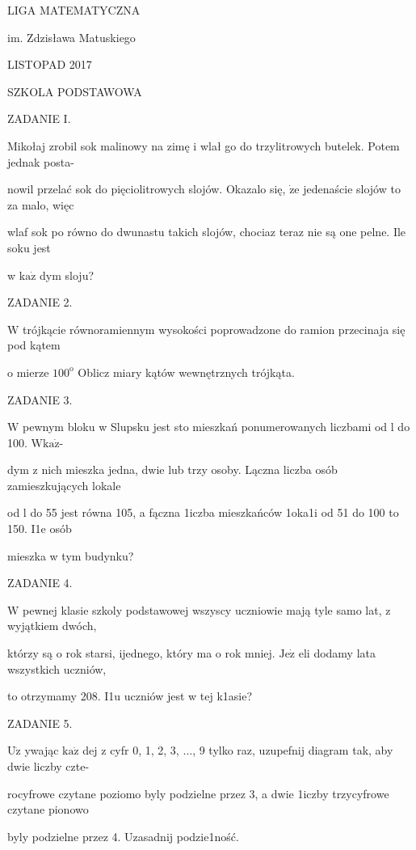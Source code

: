 \documentclass[a4paper,12pt]{article}
\begin{document}
LIGA MATEMATYCZNA

im. Zdzisława Matuskiego

LISTOPAD 2017

SZKOLA PODSTAWOWA

ZADANIE I.

Mikołaj zrobil sok malinowy na zimę i wlał go do trzylitrowych butelek. Potem jednak posta-

nowil przelać sok do pięciolitrowych slojów. Okazalo się, $\dot{\mathrm{z}}\mathrm{e}$ jedenaście slojów to za malo, więc

wlaf sok po równo do dwunastu takich slojów, chociaz teraz nie są one pelne. Ile soku jest

w $\mathrm{k}\mathrm{a}\dot{\mathrm{z}}$ dym sloju?

ZADANIE 2.

$\mathrm{W}$ trójkącie równoramiennym wysokości poprowadzone do ramion przecinaja się pod kątem

o mierze $100^{\mathrm{o}}$ Oblicz miary kątów wewnętrznych trójkąta.

ZADANIE 3.

$\mathrm{W}$ pewnym bloku w Slupsku jest sto mieszkań ponumerowanych liczbami od l do 100. $\mathrm{W}\mathrm{k}\mathrm{a}\dot{\mathrm{z}}$-

dym z nich mieszka jedna, dwie lub trzy osoby. Lączna liczba osób zamieszkujących lokale

od l do 55 jest równa 105, a fączna 1iczba mieszkańców 1oka1i od 51 do 100 to 150. I1e osób

mieszka w tym budynku?

ZADANIE 4.

$\mathrm{W}$ pewnej klasie szkoly podstawowej wszyscy uczniowie mają tyle samo lat, z wyjątkiem dwóch,

którzy są o rok starsi, ijednego, który ma o rok mniej. $\mathrm{J}\mathrm{e}\dot{\mathrm{z}}$ eli dodamy lata wszystkich uczniów,

to otrzymamy 208. I1u uczniów jest w tej k1asie?

ZADANIE 5.

$\mathrm{U}\dot{\mathrm{z}}$ ywając $\mathrm{k}\mathrm{a}\dot{\mathrm{z}}$ dej z cyfr 0, 1, 2, 3, $\ldots$, 9 tylko raz, uzupefnij diagram tak, aby dwie liczby czte-

rocyfrowe czytane poziomo byly podzielne przez 3, a dwie 1iczby trzycyfrowe czytane pionowo

byly podzielne przez 4. Uzasadnij podzie1ność.
\end{document}
